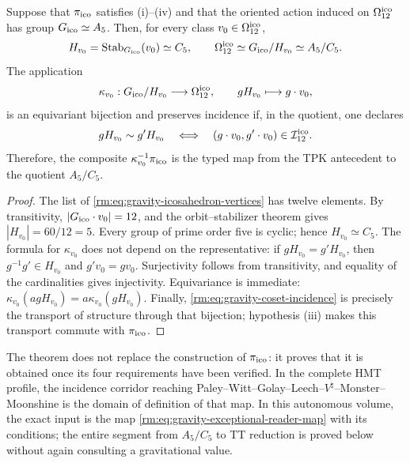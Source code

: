 \begin{theorem}
\label{rm:thm:gravity-exceptional-descent}
Suppose that \(\pi_{\rm ico}\) satisfies (i)--(iv) and that the oriented action
induced on \(\Omega_{12}^{\rm ico}\) has group
\(G_{\rm ico}\simeq A_5\). Then, for every class
\(v_0\in\Omega_{12}^{\rm ico}\),
\begin{equation}
\label{rm:eq:gravity-icosahedral-quotient}
H_{v_0}=\operatorname{Stab}_{G_{\rm ico}}(v_0)\simeq C_5,
\qquad
\Omega_{12}^{\rm ico}\simeq G_{\rm ico}/H_{v_0}\simeq A_5/C_5.
\end{equation}
The application
\begin{equation}
\label{rm:eq:gravity-coset-map}
\kappa_{v_0}:G_{\rm ico}/H_{v_0}\longrightarrow\Omega_{12}^{\rm ico},
\qquad gH_{v_0}\longmapsto g\cdot v_0,
\end{equation}
is an equivariant bijection and preserves incidence if, in the quotient,
one declares
\begin{equation}
\label{rm:eq:gravity-coset-incidence}
gH_{v_0}\sim g'H_{v_0}
\quad\Longleftrightarrow\quad
(g\cdot v_0,g'\cdot v_0)\in\mathcal I_{12}^{\rm ico}.
\end{equation}
Therefore, the composite \(\kappa_{v_0}^{-1}\pi_{\rm ico}\) is the typed map from the TPK
antecedent to the quotient \(A_5/C_5\).
\end{theorem}

\begin{proof}
The list of \cref{rm:eq:gravity-icosahedron-vertices} has twelve elements. By transitivity, \(|G_{\rm ico}\cdot v_0|=12\), and the orbit--stabilizer theorem gives \(|H_{v_0}|=60/12=5\). Every group of prime order five is cyclic; hence \(H_{v_0}\simeq C_5\). The formula for \(\kappa_{v_0}\) does not depend on the representative: if \(gH_{v_0}=g'H_{v_0}\), then \(g^{-1}g'\in H_{v_0}\) and \(g'v_0=gv_0\). Surjectivity follows from transitivity, and equality of the cardinalities gives injectivity. Equivariance is immediate: \(\kappa_{v_0}(agH_{v_0})=a\kappa_{v_0}(gH_{v_0})\). Finally, \cref{rm:eq:gravity-coset-incidence} is precisely the transport of structure through that bijection; hypothesis (iii) makes this transport commute with \(\pi_{\rm ico}\).
\end{proof}

The theorem does not replace the construction of \(\pi_{\rm ico}\): it proves
that it is obtained once its four requirements have been verified. In the complete
HMT profile, the incidence corridor reaching
Paley--Witt--Golay--Leech--\(V^\natural\)--Monster--Moonshine is the
domain of definition of that map. In this autonomous volume, the exact input is
the map \cref{rm:eq:gravity-exceptional-reader-map} with its conditions; the entire
segment from \(A_5/C_5\) to TT reduction is proved below
without again consulting a gravitational value.

